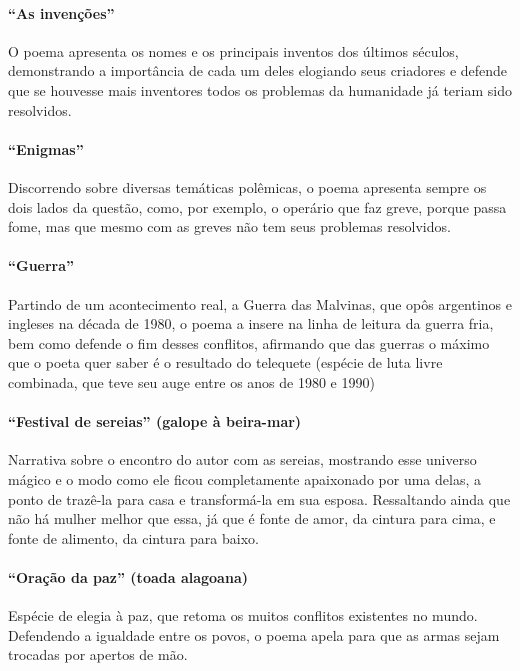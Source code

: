 \paragraph{``As invenções''}

O poema apresenta os nomes e os principais inventos dos últimos séculos,
demonstrando a importância de cada um deles elogiando seus criadores 
e defende que se houvesse mais inventores todos os
problemas da humanidade já teriam sido resolvidos.

\paragraph{``Enigmas''}

Discorrendo sobre diversas temáticas polêmicas, o poema apresenta sempre
os dois lados da questão, como, por exemplo, o operário que faz greve,
porque passa fome, mas que mesmo com as greves não tem seus problemas
resolvidos.

\paragraph{``Guerra''}

Partindo de um acontecimento real, a Guerra das Malvinas, que opôs
argentinos e ingleses na década de 1980, o poema a insere na linha de
leitura da guerra fria, bem como defende o fim desses conflitos,
afirmando que das guerras o máximo que o poeta quer saber é o resultado
do telequete (espécie de luta livre combinada, que teve seu auge entre
os anos de 1980 e 1990)

\paragraph{``Festival de sereias'' (galope à beira-mar)}

Narrativa sobre o encontro do autor com as sereias, mostrando esse
universo mágico e o modo como ele ficou completamente apaixonado por
uma delas, a ponto de trazê-la para casa e transformá-la em sua esposa.
Ressaltando ainda que não há mulher melhor que essa, já que é fonte de
amor, da cintura para cima, e fonte de alimento, da cintura para baixo.

\paragraph{``Oração da paz'' (toada alagoana)}

Espécie de elegia à paz, que retoma os muitos conflitos existentes no
mundo. Defendendo a igualdade entre os povos, o poema apela para que as
armas sejam trocadas por apertos de mão.

